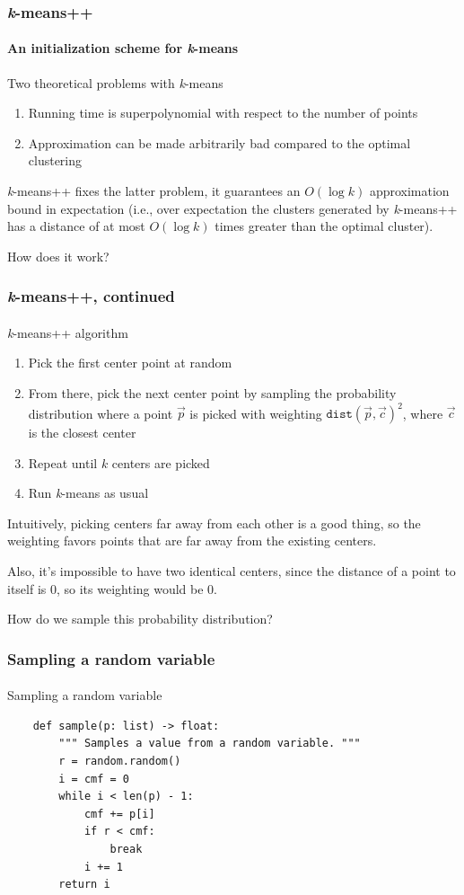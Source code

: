 \documentclass{beamer}                             %
\begin{document}
\begin{frame}
\frametitle{\textit{k}-means++}
\framesubtitle{An initialization scheme for \textit{k}-means}
\begin{block}{Two theoretical problems with \textit{k}-means}
  \begin{enumerate}
  \item Running time is superpolynomial with respect to the number of points
  \item Approximation can be made arbitrarily bad compared to the 
    optimal clustering \pause
\end{enumerate}
\end{block}

\textit{k}-means++ fixes the latter problem, it guarantees an \( O(\log k) \) 
approximation bound in expectation (i.e., over expectation the clusters
generated by \textit{k}-means++ has a distance of at most \( O(\log k) \)
times greater than the optimal cluster). \pause

How does it work?
\end{frame}

\begin{frame}
\frametitle{\textit{k}-means++, continued}
\framesubtitle{}
\begin{block}{\textit{k}-means++ algorithm}
  \begin{enumerate}
    \item Pick the first center point at random \pause
    \item From there, pick the next center point by sampling the probability
      distribution where a point \( \vec{p} \) is picked with weighting
      \( \texttt{dist}(\vec{p}, \vec{c})^2 \),
      where \( \vec{c} \) is the closest center \pause
    \item Repeat until \( k \) centers are picked
    \item Run \textit{k}-means as usual \pause
  \end{enumerate}
\end{block}
Intuitively, picking centers far away from each other is a good thing, so the
weighting favors points that are far away from the existing centers. \pause

Also, it's impossible to have two identical centers, since the distance of a
point to itself is 0, so its weighting would be 0. \pause

How do we sample this probability distribution?
\end{frame}

\begin{frame}[fragile]
\frametitle{Sampling a random variable}
\framesubtitle{}
\begin{algorithm}[H]
  \caption{Sampling a random variable}
  \begin{verbatim}
    def sample(p: list) -> float:
        """ Samples a value from a random variable. """
        r = random.random()
        i = cmf = 0
        while i < len(p) - 1:
            cmf += p[i]
            if r < cmf:
                break
            i += 1
        return i
  \end{verbatim}
\end{algorithm}
\end{frame}
\end{document}
